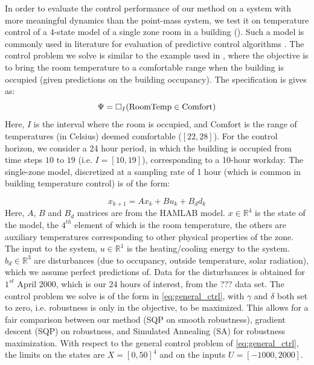 
In order to evaluate the control performance of our method on a system with more meaningful dynamics than the point-mass system, we test it on temperature control of a 4-state model of a single zone room in a building (\cite{HAMLAB}). Such a model is commonly used in literature for evaluation of predictive control algorithms \cite{AchinACC}. The control problem we solve is similar to the example used in \cite{Vasu}, where the objective is to bring the room temperature to a comfortable range when the building is occupied (given predictions on the building occupancy). The specification is gives as:
\begin{equation}
\label{eq:BldgSpec}
\Psi = \square_I(\text{RoomTemp} \in \text{Comfort})
\end{equation}
Here, $I$ is the interval where the room is occupied, and $\text{Comfort}$ is the range of temperatures (in Celsius) deemed comfortable ($[22,28]$). For the control horizon, we consider a 24 hour period, in which the building is occupied from time steps $10$ to $19$ (i.e. $I=[10,19]$), corresponding to a 10-hour workday. The single-zone model, discretized at a sampling rate of 1 hour (which is common in building temperature control) is of the form:

\begin{equation}
x_{k+1} = Ax_{k}+Bu_k+B_dd_k
\end{equation}
Here, $A$, $B$ and $B_d$ matrices are from the HAMLAB model. $x \in \mathbb{R}^4$ is the state of the model, the $4^{th}$ element of which is the room temperature, the others are auxiliary temperatures corresponding to other physical properties of the zone. The input to the system, $u \in \mathbb{R}^1$ is the heating/cooling energy to the system. $b_d \in \mathbb{R}^3$ are disturbances (due to occupancy, outside temperature, solar radiation), which we assume perfect predictions of. Data for the disturbances is obtained for $1^{st}$ April 2000, which is our 24 hours of interest, from the ??? data set. The control problem we solve is of the form in \eqref{eq:general_ctrl}, with $\gamma$ and $\delta$ both set to zero, i.e. robustness is only in the objective, to be maximized. This allows for a fair comparison between our method (SQP on smooth robustness), gradient descent (SQP) on robustness, and Simulated Annealing (SA) for robustness maximization. With respect to the general control problem of \eqref{eq:general_ctrl}, the limits on the states are $X=[0,50]^4$ and on the inputs $U=[-1000,2000]$.

